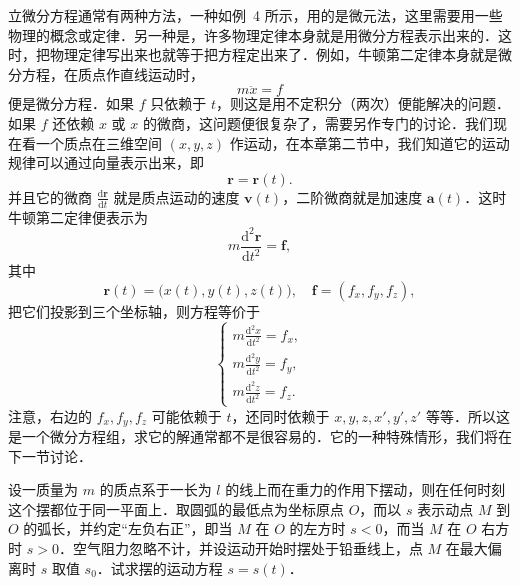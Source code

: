 立微分方程通常有两种方法，一种如例~4 所示，用的是微元法，这里需要用一些物理的概念或定律．另一种是，许多物理定律本身就是用微分方程表示出来的．这时，把物理定律写出来也就等于把方程定出来了．例如，牛顿第二定律本身就是微分方程，在质点作直线运动时，
\[
m\ddot{x} = f
\]
便是微分方程．如果 $f$ 只依赖于 $t$，则这是用不定积分（两次）便能解决的问题．如果 $f$ 还依赖 $x$ 或 $x$ 的微商，这问题便很复杂了，需要另作专门的讨论．我们现在看一个质点在三维空间 $(x, y, z)$ 作运动，在本章第二节中，我们知道它的运动规律可以通过向量表示出来，即
\[
\boldsymbol{r} = \boldsymbol{r}(t).
\]
并且它的微商 $\frac{\mathrm{d}\boldsymbol{r}}{\mathrm{d}t}$ 就是质点运动的速度 $\boldsymbol{v}(t)$，二阶微商就是加速度 $\boldsymbol{a}(t)$．这时牛顿第二定律便表示为
\[
m\frac{\mathrm{d}^2\boldsymbol{r}}{\mathrm{d}t^2} = \boldsymbol{f},
\]
其中
\[
\boldsymbol{r}(t) = \big(x(t), y(t), z(t)\big), \quad \boldsymbol{f} = (f_x, f_y, f_z),
\]
把它们投影到三个坐标轴，则方程等价于
\[
\begin{cases}
m\displaystyle\frac{\mathrm{d}^2 x}{\mathrm{d}t^2} = f_x, \\
m\displaystyle\frac{\mathrm{d}^2 y}{\mathrm{d}t^2} = f_y, \\
m\displaystyle\frac{\mathrm{d}^2 z}{\mathrm{d}t^2} = f_z.
\end{cases}
\]
注意，右边的 $f_x, f_y, f_z$ 可能依赖于 $t$，还同时依赖于 $x, y, z, x', y', z'$ 等等．所以这是一个微分方程组，求它的解通常都不是很容易的．它的一种特殊情形，我们将在下一节讨论．

\begin{example}[单摆]
设一质量为 $m$ 的质点系于一长为 $l$ 的线上而在重力的作用下摆动，则在任何时刻这个摆都位于同一平面上．取圆弧的最低点为坐标原点 $O$，而以 $s$ 表示动点 $M$ 到 $O$ 的弧长，并约定“左负右正”，即当 $M$ 在 $O$ 的左方时 $s < 0$，而当 $M$ 在 $O$ 右方时 $s > 0$．空气阻力忽略不计，并设运动开始时摆处于铅垂线上，点 $M$ 在最大偏离时 $s$ 取值 $s_0$．试求摆的运动方程 $s = s(t)$．
\end{example}

